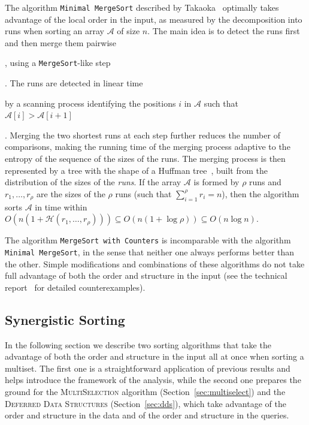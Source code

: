 The algorithm \texttt{Minimal MergeSort} described by
Takaoka~\cite{2009-Chapter-PartialSolutionAndEntropy-Takaoka}
optimally takes advantage of the local order in the input, as measured
by the decomposition into runs when sorting an array $\mathcal{A}$ of
size $n$.  The main idea is to detect the runs first and then merge
them pairwise\begin{LONG}, using a \texttt{MergeSort}-like
  step\end{LONG}. The runs are detected in linear time\begin{LONG} by
  a scanning process identifying the positions $i$ in $\mathcal{A}$
  such that $\mathcal{A}[i] > \mathcal{A}[i+1]$\end{LONG}. Merging the
two shortest runs at each step further reduces the number of
comparisons, making the running time of the merging process adaptive
to the entropy of the sequence of the sizes of the runs.  The merging
process is then represented by a tree with the shape of a Huffman
tree~\cite{1952-IRE-AMethodForTheInstructionOfMinimumRedundancyCodes-Huffman},
built from the distribution of the sizes of the \emph{runs}.  If the
array $\mathcal{A}$ is formed by $\rho$ runs and
$r_1, \dots, r_{\rho}$ are the sizes of the $\rho$ runs (such that
$\sum_{i=1}^\rho {r_i}=n$), then the algorithm sorts $\mathcal{A}$ in
time within
$O(n(1+\mathcal{H}(r_1, \dots, r_{\rho}))) \subseteq
O(n(1{+}\log{\rho})) \subseteq O(n\log{n})$.

The algorithm \texttt{MergeSort with Counters} is incomparable with
the algorithm \texttt{Minimal MergeSort}, in the sense that neither
one always performs better than the other. Simple modifications and
combinations of these algorithms do not take full advantage of both
the order and structure in the input (see the technical
report~\cite{2016-ARXIV-SynergisticSortingAndDeferredDataStructuresOnMultiSets-BarbayOchoaSatty}
for detailed counterexamples).

\subsection{Synergistic Sorting}
\label{sec:syn-sort}

In the following section we describe two sorting algorithms that take
the advantage of both the order and structure in the input all at once
when sorting a multiset. The first one is a straightforward
application of previous results and helps introduce the framework of
the analysis, while the second one prepares the ground for the
\textsc{MultiSelection} algorithm (Section~\ref{sec:multiselect}) and
the \textsc{Deferred Data Structures} (Section~\ref{sec:dds}), which
take advantage of the order and structure in the data and of the order
and structure in the queries.

